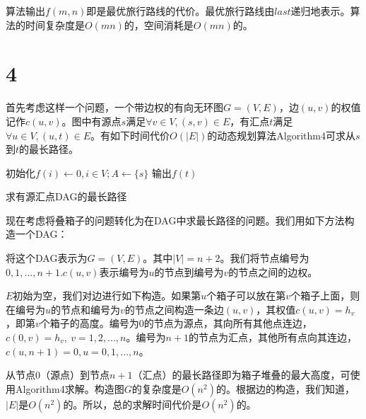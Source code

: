 \documentclass{ctexart}
\begin{document}
算法输出$f(m,n)$即是最优旅行路线的代价。最优旅行路线由$last$递归地表示。算法的时间复杂度是$O(mn)$的，空间消耗是$O(mn)$的。


\section*{4}

首先考虑这样一个问题，一个带边权的有向无环图$G=(V,E)$，边$(u,v)$的权值记作$c(u,v)$。图中有源点$s$满足$\forall v \in V, (s,v)\in E$，有汇点$t$满足$\forall u \in V, (u,t)\in E$。有如下时间代价$O(|E|)$的动态规划算法Algorithm4可求从$s$到$t$的最长路径。

\begin{algorithm}[H]
  \SetAlgoLined

  初始化$f(i)\leftarrow 0,i\in V ;A\leftarrow \{s\}$  \;
  输出$f(t)$
  \caption{求有源汇点DAG的最长路径}
\end{algorithm}


现在考虑将叠箱子的问题转化为在DAG中求最长路径的问题。我们用如下方法构造一个DAG：

将这个DAG表示为$G=(V,E)$。其中$|V|=n+2$。我们将节点编号为$0,1,...,n+1$.$c(u,v)$表示编号为$u$的节点到编号为$v$的节点之间的边权。

$E$初始为空，我们对边进行如下构造。如果第$u$个箱子可以放在第$v$个箱子上面，则在编号为$u$的节点和编号为$v$的节点之间构造一条边$(u,v)$，其权值$c(u,v)=h_v$，即第$v$个箱子的高度。编号为$0$的节点为源点，其向所有其他点连边，$c(0,v)=h_v,\ v=1,2,...,n$。编号为$n+1$的节点为汇点，其他所有点向其连边，$c(u,n+1)=0,u=0,1,...,n$。

从节点$0$（源点）到节点$n+1$（汇点）的最长路径即为箱子堆叠的最大高度，可使用Algorithm4求解。构造图$G$的复杂度是$O(n^2)$的。根据边的构造，我们知道，$|E|$是$O(n^2)$的。所以，总的求解时间代价是$O(n^2)$的。
\end{document}
